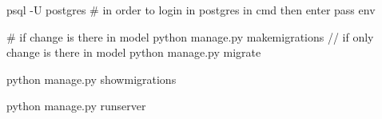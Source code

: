 psql -U postgres    # in order to login in postgres in cmd then enter pass
env\Scripts\activate

# if change is there in model
python manage.py makemigrations  // if only change is there in model
python manage.py migrate

python manage.py showmigrations

python manage.py runserver

